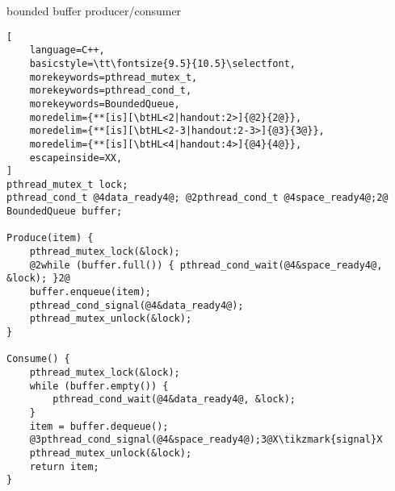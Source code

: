 \usetikzlibrary{arrows.meta,fit,matrix}

\begin{frame}[fragile,label=boundedPC]{bounded buffer producer/consumer}
\begin{lstlisting}[
    language=C++,
    basicstyle=\tt\fontsize{9.5}{10.5}\selectfont,
    morekeywords=pthread_mutex_t,
    morekeywords=pthread_cond_t,
    morekeywords=BoundedQueue,
    moredelim={**[is][\btHL<2|handout:2>]{@2}{2@}}, 
    moredelim={**[is][\btHL<2-3|handout:2-3>]{@3}{3@}}, 
    moredelim={**[is][\btHL<4|handout:4>]{@4}{4@}}, 
    escapeinside=XX,
]
pthread_mutex_t lock;
pthread_cond_t @4data_ready4@; @2pthread_cond_t @4space_ready4@;2@
BoundedQueue buffer;

Produce(item) {
    pthread_mutex_lock(&lock);
    @2while (buffer.full()) { pthread_cond_wait(@4&space_ready4@, &lock); }2@
    buffer.enqueue(item);
    pthread_cond_signal(@4&data_ready4@);
    pthread_mutex_unlock(&lock);
}

Consume() {
    pthread_mutex_lock(&lock);
    while (buffer.empty()) {
        pthread_cond_wait(@4&data_ready4@, &lock);
    }
    item = buffer.dequeue();
    @3pthread_cond_signal(@4&space_ready4@);3@X\tikzmark{signal}X
    pthread_mutex_unlock(&lock);
    return item;
}
\end{lstlisting}
\end{frame}

